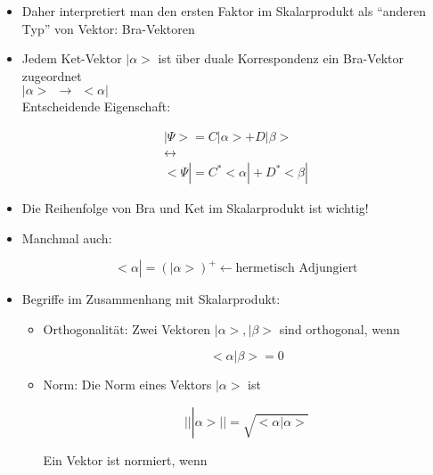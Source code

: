 \documentclass[10pt,article,colorback,accentcolor=tud9d]{scrartcl}
\begin{document}
\begin{itemize}
\begin{fleqn}
\begin{itemize}
\end{itemize}
\end{fleqn}
\item Daher interpretiert man den ersten Faktor im Skalarprodukt als "`anderen Typ"' von Vektor: Bra-Vektoren
\item Jedem Ket-Vektor $\left|\right.\alpha>$ ist über duale Korrespondenz ein Bra-Vektor zugeordnet\\
$\left|\right.\alpha> \ \ \rightarrow \ \ <\alpha\left|\right.$\\
Entscheidende Eigenschaft:
\begin{fleqn}
\begin{equation}
\begin{aligned}
\left|\right.\Psi> = C \left|\right.\alpha> +D\left|\right.\beta>\\
\longleftrightarrow\\
<\Psi\left|\right.=C^*<\alpha\left|\right. +D^* <\beta\left|\right.
\end{aligned}
\end{equation}
\end{fleqn}
\item Die Reihenfolge von Bra und Ket im Skalarprodukt ist wichtig!
\item Manchmal auch:
\begin{fleqn}
\begin{equation}
<\alpha\left|\right.=(\left|\right.\alpha>)^+ \leftarrow \text{hermetisch Adjungiert}
\end{equation}
\end{fleqn}
\item Begriffe im Zusammenhang mit Skalarprodukt:
\begin{itemize}
\item Orthogonalität: Zwei Vektoren $\left|\right.\alpha>, \left|\right.\beta>$ sind orthogonal, wenn
\begin{fleqn}
\begin{equation}
<\alpha\left|\right.\beta>=0
\end{equation}
\end{fleqn}
\item Norm: Die Norm eines Vektors $\left|\right.\alpha>$ ist 
\begin{fleqn}
\begin{equation}
\left|\right|\left|\right.\alpha>\left|\right|=\sqrt{<\alpha\left|\right.\alpha>}
\end{equation}
\end{fleqn}
Ein Vektor ist normiert, wenn
\begin{fleqn}

\end{fleqn}
\end{itemize}
\end{itemize}
\end{document}
